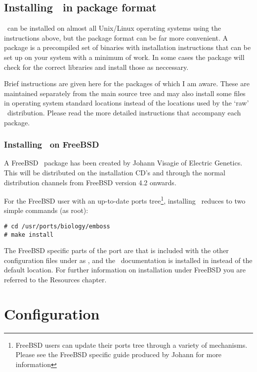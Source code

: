 \documentclass{report}
\begin{document}
\section{Installing \EMBOSS\ in package format}
\label{sec:FreeBSD}
\EMBOSS\ can be installed on almost all Unix/Linux operating systems using the instructions above, but the package format can be far more convenient. 
A package is a precompiled set of binaries with installation instructions that can be set up on your system with a minimum of work. In some cases the package will check for the correct libraries and install those as neccessary.

Brief instructions are given here for the packages of which I am aware. These are maintained separately from the main source tree and may also install some files in operating system standard locations instead of the locations used by the `raw' \EMBOSS\ distribution. Please read the more detailed instructions that accompany each package.

\subsection{Installing \EMBOSS\ on FreeBSD}

A FreeBSD \EMBOSS\ package has been created by Johann Visagie of Electric Genetics. This will be distributed on the installation CD's and through the normal distribution channels from FreeBSD version 4.2 onwards.

For the FreeBSD user with an up-to-date ports tree\footnote{FreeBSD users can update their ports tree through a variety of mechanisms. Please see the FreeBSD specific guide produced by Johann for more information}, installing \EMBOSS\
reduces to two simple commands (as root):
\begin{verbatim}
# cd /usr/ports/biology/emboss
# make install
\end{verbatim}

The FreeBSD specific parts of the port are that  is included with the other configuration files under  as , and the \EMBOSS\ documentation is installed in  instead of the default location.
For further information on installation under FreeBSD you are referred to the Resources chapter.


\chapter{Configuration}
 
\end{document}
